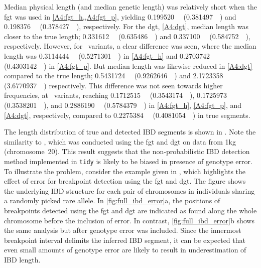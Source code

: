 Median physical length (and median genetic length) was relatively short when the \gls{fgt} was used in \cref{A4:fgt_h,,A4:fgt_p}, yielding \SI{0.199520}{\mega\basepair} (\SI{0.381497}{\centi\morgan}) and \SI{0.198376}{\mega\basepair} (\SI{0.378427}{\centi\morgan}), respectively.
For the \gls{dgt}, \cref{A4:dgt}, median length was closer to the true length; \SI{0.331612}{\mega\basepair} (\SI{0.635486}{\centi\morgan}) and \SI{0.337100}{\mega\basepair} (\SI{0.584752}{\centi\morgan}), respectively.
However, for ~variants, a clear difference was seen, where the median length was
\SI{0.3114444}{\mega\basepair} (\SI{0.5271301}{\centi\morgan}) in \ref{A4:fgt_h} and
\SI{0.2703742}{\mega\basepair} (\SI{0.4303142}{\centi\morgan}) in \ref{A4:fgt_p}.
But median length was likewise reduced in \ref{A4:dgt} compared to the true length; \SI{0.5431724}{\mega\basepair} (\SI{0.9262646}{\centi\morgan}) and
\SI{2.1723358}{\mega\basepair} (\SI{3.6770937}{\centi\morgan}) respectively.
This difference was not seen towards higher frequencies, \eg at ~variants, reaching
\SI{0.1712515}{\mega\basepair} (\SI{0.3543174}{\centi\morgan}),
\SI{0.1725973}{\mega\basepair} (\SI{0.3538201}{\centi\morgan}), and
\SI{0.2886190}{\mega\basepair} (\SI{0.5784379}{\centi\morgan}) in
\ref{A4:fgt_h}, \ref{A4:fgt_p}, and \ref{A4:dgt}, respectively, compared to
\SI{0.2275384}{\mega\basepair} (\SI{0.4081054}{\centi\morgan}) in true segments.

The length distribution of true and detected IBD segments is shown in .
Note the similarity to , which was conducted using the \gls{fgt} and \gls{dgt} on data from \gls{1kg} (chromosome~20).
This result suggests that the non-probabilistic IBD detection method implemented in \texttt{tidy} is likely to be biased in presence of genotype error.
To illustrate the problem, consider the example given in , which highlights the effect of error for breakpoint detection using the \gls{fgt} and \gls{dgt}.
The figure shows the underlying IBD structure for each pair of chromosomes in  individuals sharing a randomly picked rare allele.
In \cref{fig:full_ibd_error}{a}, the positions of breakpoints detected using the \gls{fgt} and \gls{dgt} are indicated as found along the whole chromosome before the inclusion of error.
In contrast, \cref{fig:full_ibd_error}{b} shows the same analysis but after genotype error was included.
Since the innermost breakpoint interval delimits the inferred IBD segment, it can be expected that even small amounts of genotype error are likely to result in underestimation of IBD length.

